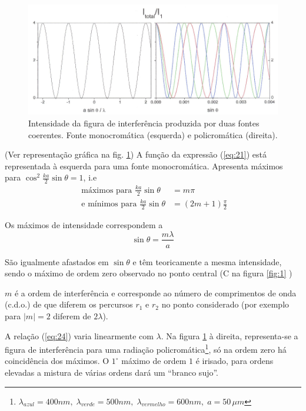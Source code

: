 \documentclass[a4paper,12pt]{article}
\begin{document}
\begin{figure}[h!tb]  \centering 
	\includegraphics[width=\textwidth]{figura2} 
	\caption{Intensidade da figura de interferência produzida por duas fontes coerentes. Fonte monocromática (esquerda) e policromática (direita).\label{fig:2}} 
\end{figure}


(Ver representação gráfica na fig. \ref{fig:2})
A função da expressão (\ref{eq:21}) está representada à esquerda para uma fonte monocromática.
Apresenta máximos para $ \cos^2 \frac{k a}{2} \sin \theta = 1 $, i.e
\begin{align}
	\text{ máximos para }\frac{k a}{2} \sin \theta &= m \pi \label{eq:22} \\
	\text{ e mínimos para } \frac{k a}{2} \sin \theta &= (2m +1)\frac{\pi}{2} \label{eq:23} 
\end{align}

Os máximos de intensidade correspondem a 
\begin{equation}
	\label{eq:24} \sin \theta = \frac{m \lambda}{a} 
\end{equation}

São igualmente afastados em $\sin \theta$ e têm teoricamente a mesma intensidade, sendo o máximo de ordem zero observado no ponto central (C na figura \ref{fig:1} )

$m$ é a ordem de interferência e corresponde ao número de comprimentos de onda (c.d.o.) de que diferem os percursos $r_1$ e $r_2$ no ponto considerado (por exemplo para $|m|=2$ diferem de $2\lambda$). 

A relação (\ref{eq:24}) varia linearmente com $\lambda$. Na figura \ref{fig:2} à direita, representa-se a figura de interferência para uma radiação policromática\footnote{$\lambda_{azul} = 400nm,\; \lambda_{verde} = 500nm,\; \lambda_{vermelho} = 600nm,\; a= 50\, \mu m$}, só na ordem zero há coincidência dos máximos. O $1^{\circ}$ máximo de ordem $1$ é irisado, para ordens elevadas a mistura de várias ordens dará um ``branco sujo''.
\end{document}
